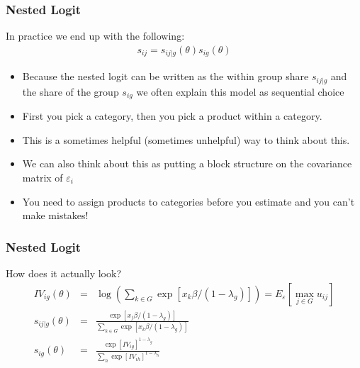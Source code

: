 \documentclass[xcolor=pdftex,dvipsnames,table,mathserif]{beamer}
\begin{document}
\begin{frame}
\frametitle{Nested Logit}
In practice we end up with the following:
\begin{eqnarray*}
s_{ij} = s_{ij|g}(\theta) s_{ig}(\theta)
\end{eqnarray*}
\begin{itemize}
\item Because the nested logit can be written as the within group share $s_{ij|g}$ and the share of the group $s_{ig}$ we often explain this model as \alert{sequential choice}
\item First you pick a category, then you pick a product within a category.
\item This is a sometimes helpful (sometimes unhelpful) way to think about this.
\item We can also think about this as putting a block structure on the covariance matrix of $\varepsilon_i$
\item You need to assign products to categories \alert{before you estimate} and you can't make mistakes!
\end{itemize}
\end{frame}

\begin{frame}
\frametitle{Nested Logit}
How does it actually look?
\begin{eqnarray*}
 IV_{ig}(\theta) &=& \log \left(\sum_{k \in G} \exp [x_k \beta/(1-\lambda_g)] \right) = E_{\varepsilon}[\max_{j \in G} u_{ij}]\\
 s_{ij|g}(\theta) &=& \frac{\exp [x_j \beta/(1-\lambda_g)]}{\sum_{k \in G} \exp [x_k \beta/(1-\lambda_g)]} \\
 s_{ig}(\theta) &=& \frac{\exp [IV_{ig}]^{1-\lambda_g}}{\sum_{h} \exp [IV_{ih}]^{1-\lambda_h}} 
\end{eqnarray*}
\end{frame}
\end{document}
